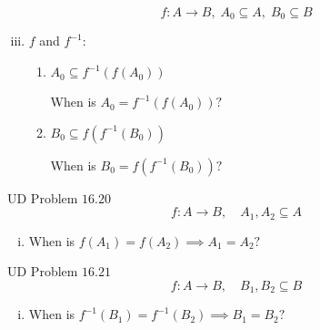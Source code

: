\begin{frame}{}
  \begin{theorem}
    \[
      f: A \to B,\; A_0 \subseteq A,\; B_0 \subseteq B
    \]

    \vspace{-0.10cm}
    \begin{enumerate}[(i)]
      \setcounter{enumi}{2}
      \item $f$ and $f^{-1}$: \\[8pt]
	\begin{enumerate}[(1)]
	  \setlength{\itemsep}{15pt}
	  \setcounter{enumii}{8}
	    \item $A_0 \subseteq f^{-1}(f(A_0))$
	      \centerline{ When is $A_0 = f^{-1}(f(A_0))?$}
	    \pause
	    \item $B_0 \subseteq f(f^{-1}(B_0))$
	      \centerline{ When is $B_0 = f(f^{-1}(B_0))?$}
	\end{enumerate}
    \end{enumerate}
  \end{theorem}
\end{frame}

\begin{frame}{}
  \begin{exampleblock}{UD Problem $16.20$}
    \[
      f: A \to B, \quad A_1, A_2 \subseteq A
    \]

    \begin{enumerate}[(i)]
      \centering
      \item When is $f(A_1) = f(A_2) \implies A_1 = A_2?$
    \end{enumerate}
  \end{exampleblock}
\end{frame}

\begin{frame}{}
  \begin{exampleblock}{UD Problem $16.21$}
    \[
      f: A \to B, \quad B_1, B_2 \subseteq B
    \]

    \begin{enumerate}[(i)]
      \centering
      \item When is $f^{-1}(B_1) = f^{-1}(B_2) \implies B_1 = B_2?$
    \end{enumerate}
  \end{exampleblock}
\end{frame}

